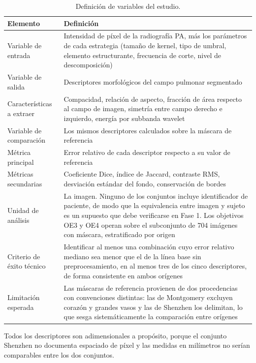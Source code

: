 \documentclass[12pt,a4paper]{article}
\begin{document}
\begin{table}[H]
\centering
\caption{Definición de variables del estudio.}
\small
\begin{tabular}{@{}p{4.2cm}p{9.5cm}@{}}
\toprule
\textbf{Elemento} & \textbf{Definición} \\
\midrule
Variable de entrada & Intensidad de píxel de la radiografía PA, más los parámetros de cada estrategia (tamaño de kernel, tipo de umbral, elemento estructurante, frecuencia de corte, nivel de descomposición) \\
\addlinespace
Variable de salida & Descriptores morfológicos del campo pulmonar segmentado \\
\addlinespace
Características a extraer & Compacidad, relación de aspecto, fracción de área respecto al campo de imagen, simetría entre campo derecho e izquierdo, energía por subbanda wavelet \\
\addlinespace
Variable de comparación & Los mismos descriptores calculados sobre la máscara de referencia \\
\addlinespace
Métrica principal & Error relativo de cada descriptor respecto a su valor de referencia \\
\addlinespace
Métricas secundarias & Coeficiente Dice, índice de Jaccard, contraste RMS, desviación estándar del fondo, conservación de bordes \\
\addlinespace
Unidad de análisis & La imagen. Ninguno de los conjuntos incluye identificador de paciente, de modo que la equivalencia entre imagen y sujeto es un supuesto que debe verificarse en Fase 1. Los objetivos OE3 y OE4 operan sobre el subconjunto de 704 imágenes con máscara, estratificado por origen \\
\addlinespace
Criterio de éxito técnico & Identificar al menos una combinación cuyo error relativo mediano sea menor que el de la línea base sin preprocesamiento, en al menos tres de los cinco descriptores, de forma consistente en ambos orígenes \\
\addlinespace
Limitación esperada & Las máscaras de referencia provienen de dos procedencias con convenciones distintas: las de Montgomery excluyen corazón y grandes vasos y las de Shenzhen los delimitan, lo que sesga sistemáticamente la comparación entre orígenes \\
\bottomrule
\end{tabular}
\end{table}

Todos los descriptores son adimensionales a propósito, porque el conjunto
Shenzhen no documenta espaciado de píxel y las medidas en milímetros no serían
comparables entre los dos conjuntos.
\end{document}
